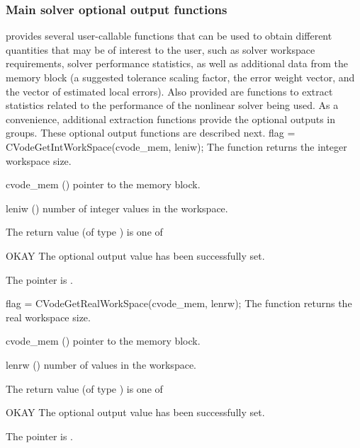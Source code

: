 \subsubsection{Main solver optional output functions}
{\cvode} provides several user-callable functions that can be used to obtain
different quantities that may be of interest to the user, such as solver workspace
requirements, solver performance statistics, as well as additional data from
the {\cvode} memory block (a suggested tolerance scaling factor, the error weight
vector, and the vector of estimated local errors). Also provided are functions to
extract statistics related to the performance of the {\cvode} nonlinear solver
being used. As a convenience, additional extraction functions provide the optional 
outputs in groups.
These optional output functions are described next.
{
  flag = CVodeGetIntWorkSpace(cvode\_mem, leniw);
}
{
  The function  returns the
  {\cvode} integer workspace size.
}
{
  \begin{args}
  \item[cvode\_mem] ()
    pointer to the {\cvode} memory block.
  \item[leniw] ()
    number of integer values in the {\cvode} workspace.
  \end{args}
}
{
  The return value  (of type ) is one of
  \begin{args}
  \item[OKAY] 
    The optional output value has been successfully set.
  \item[\Id{CVG\_NO\_MEM}]
    The  pointer is .
  \end{args}
}
{}
{
  flag = CVodeGetRealWorkSpace(cvode\_mem, lenrw);
}
{
  The function  returns the
  {\cvode} real workspace size.
}
{
  \begin{args}
  \item[cvode\_mem] ()
    pointer to the {\cvode} memory block.
  \item[lenrw] ()
    number of  values in the {\cvode} workspace.
  \end{args}
}
{
  The return value  (of type ) is one of
  \begin{args}
  \item[OKAY] 
    The optional output value has been successfully set.
  \item[\Id{CVG\_NO\_MEM}]
    The  pointer is .
  \end{args}
}
